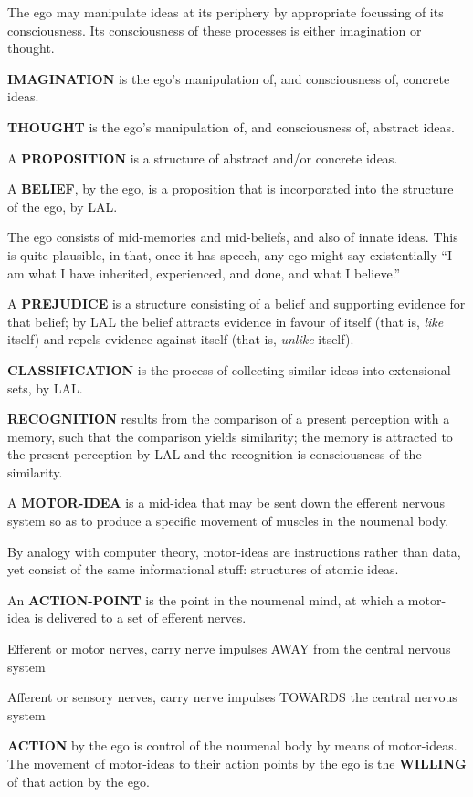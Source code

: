 \documentclass[11pt]{article}
\begin{document}
{{The ego may manipulate ideas at its periphery by appropriate
focussing of its consciousness. Its consciousness of these
processes is either imagination or thought.

\textbf{IMAGINATION} is the ego's manipulation of, and consciousness of,
concrete ideas.

\textbf{THOUGHT} is the ego's manipulation of, and consciousness
of, abstract ideas.

A \textbf{PROPOSITION} is a structure of abstract and/or concrete
ideas.

A \textbf{BELIEF}, by the ego, is a proposition that is incorporated
into the structure of the ego, by LAL.

The ego consists of mid-memories and mid-beliefs, and also
of innate ideas. This is quite plausible, in that, once it
has speech, any ego might say existentially ``I am what I
have inherited, experienced, and done, and what I believe.''

A \textbf{PREJUDICE} is a structure consisting of a belief and
supporting evidence for that belief; by LAL the belief
attracts evidence in favour of itself (that is, \emph{like}
itself) and repels evidence against itself (that is,
\emph{unlike} itself).

\textbf{CLASSIFICATION} is the process of collecting similar ideas
into extensional sets, by LAL.

\textbf{RECOGNITION} results from the comparison of a present
perception with a memory, such that the comparison yields
similarity; the memory is attracted to the present perception
by LAL and the recognition is consciousness of the similarity.

A \textbf{MOTOR-IDEA} is a mid-idea that may be sent down the
efferent nervous system so as to produce a specific movement
of muscles in the noumenal body.

By analogy with computer theory, motor-ideas are instructions
rather than data, yet consist of the same informational
stuff: structures of atomic ideas.

An \textbf{ACTION-POINT} is the point in the noumenal mind,
at which a motor-idea is delivered to a set of efferent
nerves.

Efferent or motor nerves, carry nerve impulses AWAY from the central nervous system

Afferent or sensory nerves, carry nerve impulses TOWARDS the central nervous system

\textbf{ACTION} by the ego is control of the noumenal body by means
of motor-ideas. The movement of motor-ideas to their action
points by the ego is the \textbf{WILLING} of that action by the ego.

}}
\end{document}
